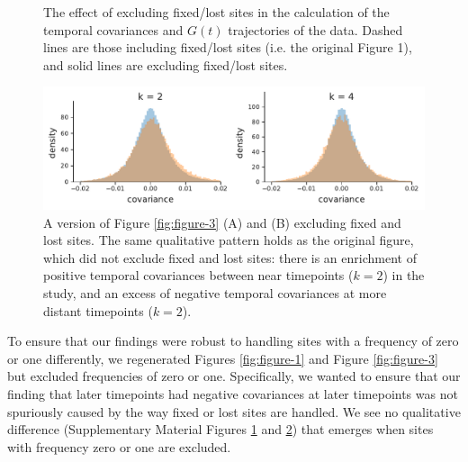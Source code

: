 \documentclass[11pt]{article}
\begin{document}
{\begin{figure}[!ht]
  \caption{The effect of excluding fixed/lost sites in the calculation of the
  temporal covariances and $G(t)$ trajectories of the \textcite{Barghi2019-qy}
data. Dashed lines are those including fixed/lost sites (i.e. the original
Figure 1), and solid lines are excluding fixed/lost sites.}

  \label{suppfig:supp-fig-1-nofix}
\end{figure}

\begin{figure}[!ht]
  \centering
  \includegraphics{figures/figure-3-hists-b-without-fixations.pdf}

  \caption{A version of Figure \ref{fig:figure-3} (A) and (B) excluding fixed
    and lost sites. The same qualitative pattern holds as the original figure,
    which did not exclude fixed and lost sites: there is an enrichment of
    positive temporal covariances between near timepoints ($k=2$) in the
  \textcite{Barghi2019-qy} study, and an excess of negative temporal
covariances at more distant timepoints ($k=2$). }

  \label{suppfig:supp-fig-3-nofix}
\end{figure}


To ensure that our findings were robust to handling sites with a frequency of
zero or one differently, we regenerated Figures \ref{fig:figure-1} and Figure
\ref{fig:figure-3} but excluded frequencies of zero or one. Specifically, we
wanted to ensure that our finding that later timepoints had negative
covariances at later timepoints was not spuriously caused by the way fixed or
lost sites are handled. We see no qualitative difference (Supplementary
Material Figures \ref{suppfig:supp-fig-1-nofix} and
\ref{suppfig:supp-fig-3-nofix}) that emerges when sites with frequency zero or
one are excluded.


}
\end{document}
